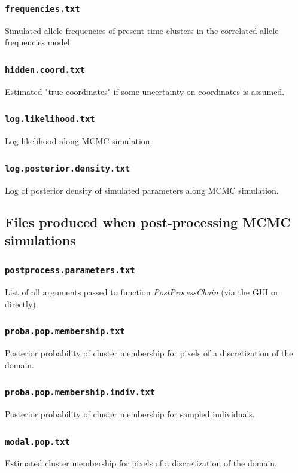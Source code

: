 \documentclass{article}
\begin{document}
\subsubsection{\texttt{frequencies.txt}}
Simulated allele frequencies of present time clusters in the correlated allele frequencies model. 


\subsubsection{\texttt{hidden.coord.txt}}
Estimated "true coordinates" if some uncertainty on coordinates is assumed.

\subsubsection{\texttt{log.likelihood.txt}}
Log-likelihood along MCMC simulation.


\subsubsection{\texttt{log.posterior.density.txt}}
Log of posterior density of simulated parameters along MCMC simulation.

\subsection{Files produced when post-processing MCMC simulations}

\subsubsection{\texttt{postprocess.parameters.txt}}
List of all arguments passed to function {\it PostProcessChain} (via the GUI or directly).

\subsubsection{\texttt{proba.pop.membership.txt}}
Posterior probability of cluster membership for pixels of a discretization of the domain.

\subsubsection{\texttt{proba.pop.membership.indiv.txt }}\label{sec:proba.pop.membership.indiv.txt}
Posterior probability of cluster membership for sampled individuals.


\subsubsection{\texttt{modal.pop.txt }}
Estimated cluster membership for pixels of a discretization of the domain.
\end{document}
